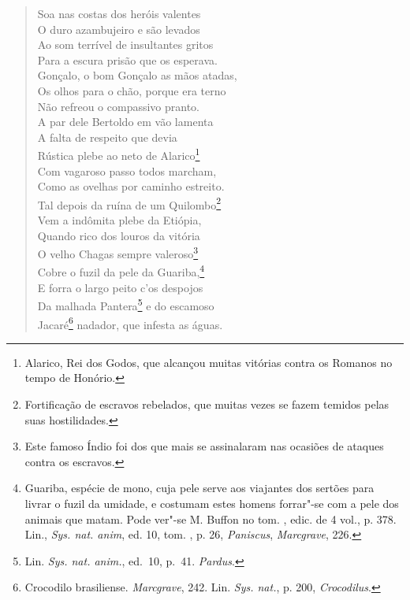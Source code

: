 \begin{verse}
Soa nas costas dos heróis valentes\\
O duro azambujeiro e são levados\\
Ao som terrível de insultantes gritos\\
Para a escura prisão que os esperava.\\
Gonçalo, o bom Gonçalo as mãos atadas,\\
Os olhos para o chão, porque era terno\\
Não refreou o compassivo pranto.\\
A par dele Bertoldo em vão lamenta\\
A falta de respeito que devia\\
Rústica plebe ao neto de Alarico\footnote{ Alarico, Rei dos Godos, que
alcançou muitas vitórias contra os Romanos no tempo de Honório.}\\
Com vagaroso passo todos marcham,\\
Como as ovelhas por caminho estreito.\\
Tal depois da ruína de um Quilombo\footnote{ Fortificação de escravos
rebelados, que muitas vezes se fazem temidos pelas suas hostilidades.}\\
Vem a indômita plebe da Etiópia,\\
Quando rico dos louros da vitória\\			\index{\Lour}
O velho Chagas sempre valeroso\footnote{ Este famoso Índio foi dos que
mais se assinalaram nas ocasiões de ataques contra os escravos.}\\
Cobre o fuzil da pele da Guariba,\footnote{ Guariba, espécie de mono, 
cuja pele serve aos viajantes dos sertões para livrar o fuzil da umidade, e
costumam estes homens forrar"-se com a pele dos animais que matam. Pode ver"-se
M. Buffon no tom. , edic. de 4 vol., p. 378. Lin., \textit{Sys. nat. anim},
ed. 10, tom. , p. 26, \textit{Paniscus}, \textit{Marcgrave}, 226.}\\		\index{\Marc}
E forra o largo peito c'os despojos\\
Da malhada Pantera\footnote{ Lin. \textit{Sys. nat. anim.}, ed.~10, p.~41. \textit{Pardus}.} e do escamoso\\
Jacaré\footnote{ Crocodilo brasiliense. \textit{Marcgrave}, 242. Lin.		
\textit{Sys. nat.}, p. 200,  \textit{Crocodilus}.} nadador, que infesta as
águas. \\[10pt] 	\index{\Marc}  %

\end{verse}

